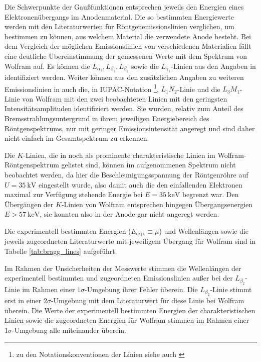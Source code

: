 Die Schwerpunkte der Gaußfunktionen entsprechen jeweils den Energien eines Elektronenübergangs im Anodenmaterial. Die so bestimmten Energiewerte werden mit den Literaturwerten für Röntgenemissionslinien verglichen, um bestimmen zu können, aus welchem Material die verwendete Anode besteht.
Bei dem Vergleich der möglichen Emissionslinien von verschiedenen Materialien fällt eine deutliche Übereinstimmung der gemessenen Werte mit dem Spektrum von Wolfram auf. Es können die $L_{\alpha_1}, L_{\beta_1}, L_{\beta_2}$ sowie die $L_{\gamma_1}$-Linien aus den Angaben in \cite{xraydatabooklet} identifiziert werden. Weiter können aus den zusätzlichen Angaben zu weiteren Emissionslinien in \cite{NISTxray} auch die, in IUPAC-Notation \footnote{zu den Notationskonventionen der Linien siehe auch \cite{IUPACrecs}}, $L_1N_2$-Linie und die $L_3M_1$-Linie von Wolfram mit den zwei beobachteten Linien mit den geringsten Intensitätsamplituden identifiziert werden. Sie wurden, relativ zum Anteil des Bremsstrahlungsuntergrund in ihrem jeweiligen Energiebereich des Röntgenspektrums, nur mit geringer Emissionsintensität angeregt und sind daher nicht einfach im Gesamtspektrum zu erkennen.

Die $K$-Linien, die in \cite{xraydatabooklet} noch als prominente charakteristische Linien im Wolfram-Röntgenspektrum gelistet sind, können im aufgenommenen Spektrum nicht beobachtet werden, da hier die Beschleunigungsspannung der Röntgenröhre auf $U=\SI{35}{\kilo\V}$ eingestellt wurde, also damit auch die den einfallenden Elektronen maximal zur Verfügung stehende Energie bei $E=\SI{35}{\kilo\eV}$ begrenzt war. Den Übergängen der $K$-Linien von Wolfram entsprechen hingegen Übergangsenergien $E>\SI{57}{\kilo\eV}$\cite{xraydatabooklet}, sie konnten also in der Anode gar nicht angeregt werden.

Die experimentell bestimmten Energien ($E_\text{exp.}\equiv\mu$) und Wellenlängen sowie die jeweils zugeordneten Literaturwerte mit jeweiligem Übergang für Wolfram sind in Tabelle \ref{tab:bragg_lines} aufgeführt.

Im Rahmen der Unsicherheiten der Messwerte stimmen die Wellenlängen der experimentell bestimmten und zugeordneten Emissionslinien außer bei der $L_{\beta_2}$-Linie im Rahmen einer $1\sigma$-Umgebung ihrer Fehler überein. Die $L_{\beta_2}$-Linie stimmt erst in einer $2\sigma$-Umgebung mit dem Literaturwert für diese Linie bei Wolfram überein. Die Werte der experimentell bestimmten Energien der charakteristischen Linien sowie die zugeordneten Energien für Wolfram stimmen im Rahmen einer $1\sigma$-Umgebung alle miteinander überein.

